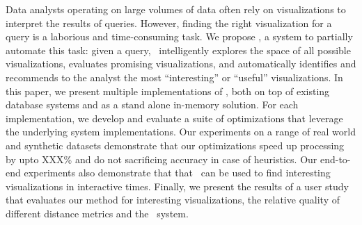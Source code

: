 

Data analysts operating on large volumes of data often rely on visualizations to
interpret the results of queries.
However, finding the right visualization for a query is a laborious and
time-consuming task.
We propose \SeeDB, a system to partially automate this task:
given a query, \SeeDB\ intelligently explores the space of all possible
visualizations, evaluates promising visualizations, and automatically identifies
and recommends to the analyst the most ``interesting'' or ``useful''
visualizations. 
In this paper, we present multiple implementations of \SeeDB,
both on top of existing database systems and as a stand alone in-memory
solution. 
For each implementation, we develop and evaluate a suite of
optimizations that leverage the underlying system implementations. 
Our
experiments  on a range of real world and synthetic datasets demonstrate that
our optimizations speed up processing by upto XXX\% and do not sacrificing
accuracy in case of heuristics. 
Our end-to-end experiments also demonstrate that
that \SeeDB\ can be used to find interesting visualizations in interactive
times. 
Finally, we present the results of a user study that evaluates our method
for interesting visualizations, the relative quality of different distance
metrics and the \SeeDB\ system.
